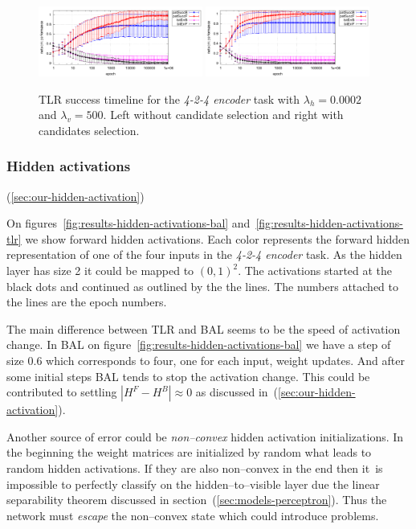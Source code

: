 \begin{figure}[H]
  \centering
  \includegraphics[width=0.48\textwidth]{img/tlr-auto4-best-perf.pdf}   
  \includegraphics[width=0.48\textwidth]{img/tlr-auto4-best-can.pdf}      
  \caption{TLR success timeline for the \emph{4-2-4 encoder} task with $\lambda_h=0.0002$ and $\lambda_v=500$. Left without candidate selection and right with candidates selection.}
  \label{fig:results-tlr-auto4-epoch} 
\end{figure}

\subsubsection{Hidden activations}
(\ref{sec:our-hidden-activation})  

On figures~\ref{fig:results-hidden-activations-bal} and~\ref{fig:results-hidden-activations-tlr} we show forward hidden activations. Each color represents the forward hidden representation of one of the four inputs in the \emph{4-2-4 encoder} task. As the hidden layer has size 2 it could be mapped to $(0,1)^2$. The activations started at the black dots and continued as outlined by the the lines. The numbers attached to the lines are the epoch numbers. 

The main difference between TLR and BAL seems to be the speed of activation change. In BAL on figure~\ref{fig:results-hidden-activations-bal} we have a step of size 0.6 which corresponds to four, one for each input, weight updates. And after some initial steps BAL tends to stop the activation change. This could be contributed to settling $|H^F-H^B| \approx 0$ as discussed in~(\ref{sec:our-hidden-activation}). 

Another source of error could be \emph{non--convex} hidden activation initializations. In the beginning the weight matrices are initialized by random what leads to random hidden activations. If they are also non--convex in the end then it~is impossible to perfectly classify on the hidden--to--visible layer due the linear separability theorem discussed in section~(\ref{sec:models-perceptron}). Thus the network must \emph{escape} the non--convex state which could introduce problems. 

